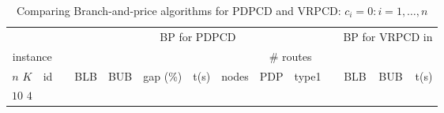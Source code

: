 \begin{table}[!htb]
\footnotesize
\caption{Comparing Branch-and-price algorithms for PDPCD and VRPCD: $c_i = 0:i = 1,\dots,n$}
\begin{tabular}{cccccrrccccccr}
\multicolumn{2}{c}{} & & \multicolumn{7}{c}{BP for PDPCD} & &
\multicolumn{3}{c}{BP for VRPCD in \cite{inoc11}} \\
\cline{4-10} \cline{12-14}
 \multicolumn{2}{c}{instance} & & & & & & & \multicolumn{2}{c}{\# routes} & & & & \\
 \cline{1-2} \cline{9-10}
$n$ \hspace{4mm} $K$ & id & & BLB & BUB & gap (\%) & t(s) & nodes & PDP & type1 &
& BLB & BUB & t(s) \\
\hline
\multirow{5}{*}{$10$ \hspace{5mm} $4$}


\end{tabular}
\end{table}
